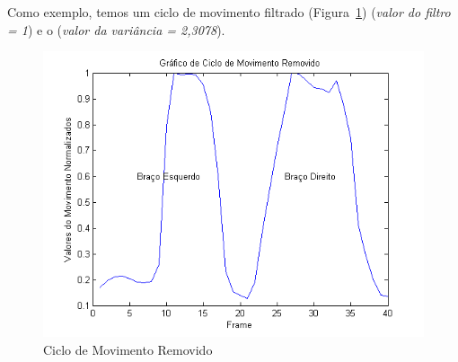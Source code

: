 
Como exemplo, temos um ciclo de movimento filtrado (Figura~\ref{img:ciclo_filtrado}) (\textit{valor do filtro = 1}) e o (\textit{valor da variância = 2,3078}).

\begin{figure}[!htb]
     \centering
     \includegraphics[width=1\textwidth]{./img/ciclomovimentoremovido.png}
     \caption{Ciclo de Movimento Removido}
		 \label{img:ciclo_filtrado}
\end{figure}












